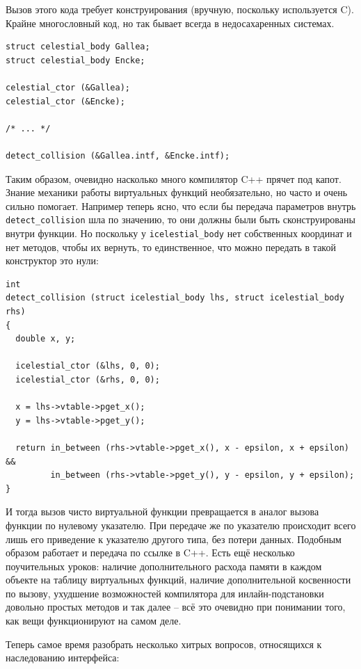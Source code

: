 \documentclass[a4paper,12pt,oneside]{article}
\begin{document}
Вызов этого кода требует конструирования (вручную, поскольку используется C). Крайне многословный код, но так бывает всегда в недосахаренных системах.

\begin{lstlisting}
struct celestial_body Gallea;
struct celestial_body Encke;

celestial_ctor (&Gallea);
celestial_ctor (&Encke);

/* ... */

detect_collision (&Gallea.intf, &Encke.intf);
\end{lstlisting}

Таким образом, очевидно насколько много компилятор C++ прячет под капот. Знание механики работы виртуальных функций необязательно, но часто и очень сильно помогает. Например теперь ясно, что если бы передача параметров внутрь \lstinline!detect_collision! шла по значению, то они должны были быть сконструированы внутри функции. Но поскольку у \lstinline!icelestial_body! нет собственных координат и нет методов, чтобы их вернуть, то единственное, что можно передать в такой конструктор это нули:

\begin{lstlisting}
int
detect_collision (struct icelestial_body lhs, struct icelestial_body rhs)
{
  double x, y;
  
  icelestial_ctor (&lhs, 0, 0);
  icelestial_ctor (&rhs, 0, 0);

  x = lhs->vtable->pget_x();
  y = lhs->vtable->pget_y();
 
  return in_between (rhs->vtable->pget_x(), x - epsilon, x + epsilon) && 
         in_between (rhs->vtable->pget_y(), y - epsilon, y + epsilon);
}
\end{lstlisting}

И тогда вызов чисто виртуальной функции превращается в аналог вызова функции по нулевому указателю. При передаче же по указателю происходит всего лишь его приведение к указателю другого типа, без потери данных. Подобным образом работает и передача по ссылке в C++. Есть ещё несколько поучительных уроков: наличие дополнительного расхода памяти в каждом объекте на таблицу виртуальных функций, наличие дополнительной косвенности по вызову, ухудшение возможностей компилятора для инлайн-подстановки довольно простых методов и так далее -- всё это очевидно при понимании того, как вещи функционируют на самом деле.

Теперь самое время разобрать несколько хитрых вопросов, относящихся к наследованию интерфейса:
\end{document}
